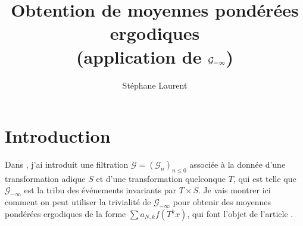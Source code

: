 \documentclass[12pt,a4paper]{article}
\author{Stéphane Laurent}
\title{\TitleFont Obtention de moyennes pondérées ergodiques \\ (application de $\GG_{-\infty}$)\vspace{-0.5cm}}
\begin{document}
\newcommand*{\TitleFont}{%
      \usefont{\encodingdefault}{\rmdefault}{b}{n}%
      \fontsize{16}{20}%
      \selectfont}

\theoremstyle{defstyle}
\newtheorem{definition}{Definition}
\newtheorem{remark}{Remark}
\newtheorem{question}{Question}
\newtheorem{clarify}{To clarify}
\theoremstyle{thmstyle}
\newtheorem{thm}{Theorem}[section]
\newtheorem{ppsition}{Proposition}
\newtheorem{lemma}{Lemma}
\newtheorem{lemme}{Lemme}[section]

\newcommand{\FF}{\mathcal{F}}
\newcommand{\GG}{\mathcal{G}}
\newcommand{\EE}{\mathbb{E}}
\newcommand{\II}{\mathcal{I}}
\newcommand{\LL}{\mathcal{L}}
\newcommand{\OO}{\mathcal{O}}
\newcommand{\XX}{\mathcal{X}}
\newcommand{\N}{\mathbb{N}}
\newcommand{\Z}{\mathbb{Z}}

\newcommand{\given}{\mid}
\newcommand{\eps}{\epsilon}
\newcommand{\indic}{\boldsymbol 1}
\newcommand{\Vb}{\boldsymbol V}

\newcommand{\indvee}{\dot{\vee}}
\newcommand{\indep}{\mathrel{\text{\scalebox{1.07}{$\perp\mkern-10mu\perp$}}}}


\maketitle


\section{Introduction}

Dans \cite{LauScale}, j'ai introduit une filtration $\GG={(\GG_n)}_{n \leq 0}$ 
associée à la donnée d'une transformation adique $S$ et d'une transformation 
quelconque $T$, qui est telle que $\GG_{-\infty}$ est la tribu des 
événements invariants par $T \times S$. 
Je vais montrer ici comment on peut utiliser la trivialité de $\GG_{-\infty}$ pour obtenir 
des moyennes pondérées ergodiques de la forme $\sum a_{N,k} f(T^k x)$, qui font 
l'objet de l'article \cite{HP}. 
 
\end{document}
